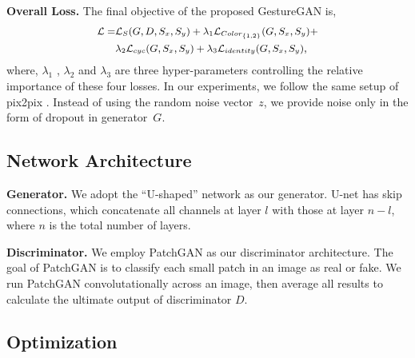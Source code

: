 \documentclass[sigconf]{acmart}
\begin{document}
\noindent \textbf{Overall Loss.} The final objective of the proposed GestureGAN is,
\begin{equation}\small
\begin{aligned}
\mathcal{L} = & \mathcal{L}_{S}(G, D, S_x, S_y)  + \lambda_1 \mathcal{L}_{Color_{\{1, 2\}}}(G, S_x, S_y) + \\ 
& \lambda_2 \mathcal{L}_{cyc}(G, S_x, S_y) + \lambda_3 \mathcal{L}_{identity}(G,S_x, S_y)	,
\end{aligned}
\label{eqn:overallloss}
\end{equation}
where, $\lambda_1$ , $\lambda_2$ and $\lambda_3$ are three hyper-parameters controlling the relative importance of these four losses.
In our experiments, we follow the same setup of pix2pix \cite{isola2017image}.
Instead of using the random noise vector~$z$, we provide noise only in the form of dropout in generator~$G$.


\subsection{Network Architecture}

\noindent\textbf{Generator.}
We adopt the ``U-shaped'' network \cite{isola2017image} as our generator.
U-net has skip connections, which concatenate all channels at layer $l$ with those at layer $n{-}l$, where $n$ is the total number of layers.

\noindent\textbf{Discriminator.}
We employ PatchGAN  \cite{isola2017image}  as our discriminator architecture.
The goal of PatchGAN  is to classify each small patch in an image as real or fake.
We run PatchGAN convolutationally across an image, then average all results to calculate the ultimate output of discriminator $D$.

\subsection{Optimization}
\end{document}
